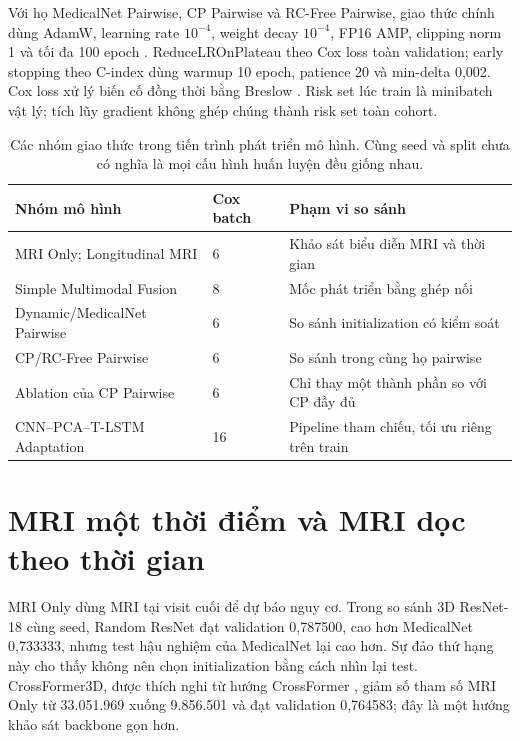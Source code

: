 Với họ MedicalNet Pairwise, CP Pairwise và RC-Free Pairwise, giao thức chính dùng AdamW, learning rate $10^{-4}$, weight decay $10^{-4}$, FP16 AMP, clipping norm 1 và tối đa 100 epoch \cite{loshchilov2019adamw}. ReduceLROnPlateau theo Cox loss toàn validation; early stopping theo C-index dùng warmup 10 epoch, patience 20 và min-delta 0,002. Cox loss xử lý biến cố đồng thời bằng Breslow \cite{cox1972regression,breslow1974covariance}. Risk set lúc train là minibatch vật lý; tích lũy gradient không ghép chúng thành risk set toàn cohort.

\begin{table}[htbp]
\centering
\small
\caption[Giao thức của các nhóm mô hình]{Các nhóm giao thức trong tiến trình phát triển mô hình. Cùng seed và split chưa có nghĩa là mọi cấu hình huấn luyện đều giống nhau.}
\label{tab:protocol-groups}
\begin{tabularx}{\linewidth}{@{}Y C{1.7cm} L{5.3cm}@{}}
\toprule
\textbf{Nhóm mô hình} & \textbf{Cox batch} & \textbf{Phạm vi so sánh} \\
\midrule
MRI Only; Longitudinal MRI & 6 & Khảo sát biểu diễn MRI và thời gian \\
Simple Multimodal Fusion & 8 & Mốc phát triển bằng ghép nối \\
Dynamic/MedicalNet Pairwise & 6 & So sánh initialization có kiểm soát \\
CP/RC-Free Pairwise & 6 & So sánh trong cùng họ pairwise \\
Ablation của CP Pairwise & 6 & Chỉ thay một thành phần so với CP đầy đủ \\
CNN--PCA--T-LSTM Adaptation & 16 & Pipeline tham chiếu, tối ưu riêng trên train \\
\bottomrule
\end{tabularx}
\end{table}

\section{MRI một thời điểm và MRI dọc theo thời gian}
\label{sec:mri-baselines}
\label{sec:longitudinal-results}
MRI Only dùng MRI tại visit cuối để dự báo nguy cơ. Trong so sánh 3D ResNet-18 cùng seed, Random ResNet đạt validation 0,787500, cao hơn MedicalNet 0,733333, nhưng test hậu nghiệm của MedicalNet lại cao hơn. Sự đảo thứ hạng này cho thấy không nên chọn initialization bằng cách nhìn lại test. CrossFormer3D, được thích nghi từ hướng CrossFormer \cite{wang2022crossformer}, giảm số tham số MRI Only từ 33.051.969 xuống 9.856.501 và đạt validation 0,764583; đây là một hướng khảo sát backbone gọn hơn.

